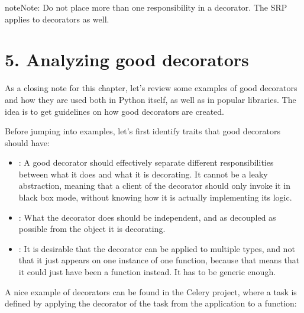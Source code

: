 \documentclass[a4paper,10pt,english]{sphinxmanual}
\begin{document}
\begin{sphinxadmonition}{note}{Note:}
Do not place more than one responsibility in a decorator. The SRP applies to decorators as well.
\end{sphinxadmonition}


\section{5. Analyzing good decorators}
\label{\detokenize{chapters/5_decorators/index:analyzing-good-decorators}}
As a closing note for this chapter, let’s review some examples of good decorators and how
they are used both in Python itself, as well as in popular libraries. The idea is to get
guidelines on how good decorators are created.

Before jumping into examples, let’s first identify traits that good decorators should have:
\begin{itemize}
\item {} 
: A good decorator should effectively separate different responsibilities between what it does and what it is decorating. It cannot be a leaky abstraction, meaning that a client of the decorator should only invoke it in black box mode, without knowing how it is actually implementing its logic.

\item {} 
: What the decorator does should be independent, and as decoupled as possible from the object it is decorating.

\item {} 
: It is desirable that the decorator can be applied to multiple types, and not that it just appears on one instance of one function, because that means that it could just have been a function instead. It has to be generic enough.

\end{itemize}

A nice example of decorators can be found in the Celery project, where a task is defined by
applying the decorator of the task from the application to a function:

\begin{sphinxVerbatim}[commandchars=\\\{\}]
 
\end{sphinxVerbatim}
\end{document}
